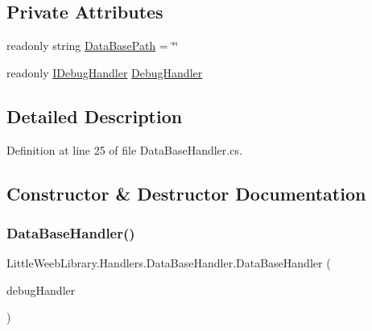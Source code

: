 \subsection*{Private Attributes}
\begin{DoxyCompactItemize}
\item 
readonly string \mbox{\hyperlink{class_little_weeb_library_1_1_handlers_1_1_data_base_handler_aeea801d75a8294727c8b8e2805b43abb}{Data\+Base\+Path}} = \char`\"{}\char`\"{}
\item 
readonly \mbox{\hyperlink{interface_little_weeb_library_1_1_handlers_1_1_i_debug_handler}{I\+Debug\+Handler}} \mbox{\hyperlink{class_little_weeb_library_1_1_handlers_1_1_data_base_handler_aa474a1f934032623ffb3ae5eb156148b}{Debug\+Handler}}
\end{DoxyCompactItemize}


\subsection{Detailed Description}


Definition at line 25 of file Data\+Base\+Handler.\+cs.



\subsection{Constructor \& Destructor Documentation}
\mbox{\label{class_little_weeb_library_1_1_handlers_1_1_data_base_handler_af3623e6075f8aaf6f5082994cd1448df}} 
\subsubsection{\texorpdfstring{Data\+Base\+Handler()}{DataBaseHandler()}}
{\footnotesize\ttfamily Little\+Weeb\+Library.\+Handlers.\+Data\+Base\+Handler.\+Data\+Base\+Handler (\begin{DoxyParamCaption}\item[{\mbox{\hyperlink{interface_little_weeb_library_1_1_handlers_1_1_i_debug_handler}{I\+Debug\+Handler}}}]{debug\+Handler }\end{DoxyParamCaption})}



